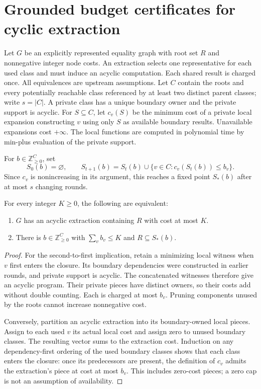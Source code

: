 \section{Grounded budget certificates for cyclic extraction}
Let $G$ be an explicitly represented equality graph with root set $R$ and
nonnegative integer node costs. An extraction selects one representative for
each used class and must induce an acyclic computation. Each shared result is
charged once. All equivalences are upstream assumptions.
Let $C$ contain the roots and every potentially reachable class referenced by
at least two distinct parent classes; write $s=|C|$. A private class has a
unique boundary owner and the private support is acyclic. For $S\subseteq C$,
let $c_v(S)$ be the minimum cost of a private local expansion constructing $v$
using only $S$ as available boundary results. Unavailable expansions cost
$+\infty$. The local functions are computed in polynomial time by min-plus
evaluation of the private support.

For $b\in\mathbb Z_{\ge0}^C$, set
\[
 S_0(b)=\varnothing,\qquad
 S_{t+1}(b)=S_t(b)\cup\{v\in C:c_v(S_t(b))\le b_v\}.
\]
Since $c_v$ is nonincreasing in its argument, this reaches a fixed point
$S_*(b)$ after at most $s$ changing rounds.

\begin{theorem}
For every integer $K\ge0$, the following are equivalent:
\begin{enumerate}
\item $G$ has an acyclic extraction containing $R$ with cost at most $K$.
\item There is $b\in\mathbb Z_{\ge0}^C$ with $\sum_v b_v\le K$ and
$R\subseteq S_*(b)$.
\end{enumerate}
\end{theorem}
\begin{proof}
For the second-to-first implication, retain a minimizing local witness when
$v$ first enters the closure. Its boundary dependencies were constructed in
earlier rounds, and private support is acyclic. The concatenated witnesses
therefore give an acyclic program. Their private pieces have distinct owners,
so their costs add without double counting. Each is charged at most $b_v$.
Pruning components unused by the roots cannot increase nonnegative cost.

Conversely, partition an acyclic extraction into its boundary-owned local
pieces. Assign to each used $v$ its actual local cost and assign zero to
unused boundary classes. The resulting vector sums to the extraction cost.
Induction on any dependency-first ordering of the used boundary classes
shows that each class enters the closure: once its predecessors are present,
the definition of $c_v$ admits the extraction's piece at cost at most $b_v$.
This includes zero-cost pieces; a zero cap is not an assumption of availability.
\end{proof}

